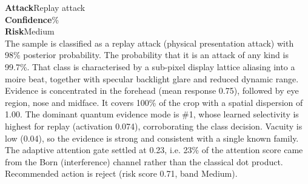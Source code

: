 \raggedright
\textbf{Attack}\quad Replay attack \\
\textbf{Confidence}\% \\
\textbf{Risk}\quad Medium \\[4pt]
The sample is classified as a replay attack (physical presentation attack) with 98\% posterior probability. The probability that it is an attack of any kind is 99.7\%. That class is characterised by a sub-pixel display lattice aliasing into a moire beat, together with specular backlight glare and reduced dynamic range. Evidence is concentrated in the forehead (mean response 0.75), followed by eye region, nose and midface. It covers 100\% of the crop with a spatial dispersion of 1.00. The dominant quantum evidence mode is \#1, whose learned selectivity is highest for replay (activation 0.074), corroborating the class decision. Vacuity is low (0.04), so the evidence is strong and consistent with a single known family. The adaptive attention gate settled at 0.23, i.e. 23\% of the attention score came from the Born (interference) channel rather than the classical dot product. Recommended action is reject (risk score 0.71, band Medium).
